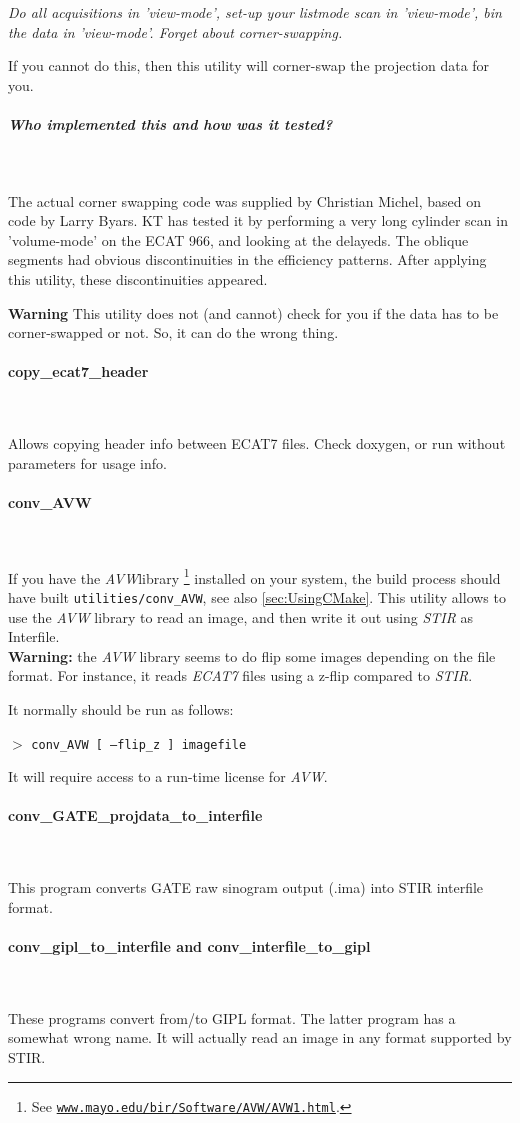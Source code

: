 \documentclass{article}
\def\url#1#2{\mbox{\href{#1}{\tt #2}}}
\newcommand{\subsubsubsection}[1]{\paragraph{#1}\mbox{} \\}
\newcommand{\subsubsubsubsection}[1]{\subparagraph{#1} \mbox{} \\}
\newcommand{\cmdline}[1]{\par \noindent $>$ \texttt{#1}\par}
\begin{document}
{{{\textit{Do all acquisitions in 'view-mode', set-up your listmode 
scan in 'view-mode', bin the data in 'view-mode'. Forget about 
corner-swapping.}


If you cannot do this, then this utility will corner-swap the 
projection data for you.

{ \subsubsubsubsection{Who implemented this and how was it tested?}
}
The actual corner swapping code was supplied by Christian Michel, 
based on code by Larry Byars. KT has tested it by performing 
a very long cylinder scan in 'volume-mode' on the ECAT 966, and 
looking at the delayeds. The oblique segments had obvious discontinuities 
in the efficiency patterns. After applying this utility, these 
discontinuities appeared.



\textbf{Warning} This utility does not (and cannot) check for you 
if the data has to be corner-swapped or not. So, it can do the 
wrong thing.

{ \subsubsubsection{copy\_ecat7\_header}
}
Allows copying header info between ECAT7 files. Check doxygen, or run without 
parameters for usage info.

{ \subsubsubsection{conv\_AVW}
}
\label{sec:convAVW}
If you have the \textit{AVW}\texttrademark  library
\footnote{See \url{http://www.mayo.edu/bir/Software/AVW/AVW1.html}
{www.mayo.edu/bir/Software/AVW/AVW1.html}.
} installed on your system, the build process should have built \texttt{utilities/conv\_AVW},
see also \ref{sec:UsingCMake}.
This utility allows to use the \textit{AVW} library to read an image, and then write it out
using \textit{STIR} as Interfile.\\
\textbf{Warning:} the \textit{AVW} library seems to do flip some images depending
on the file format. For instance, it reads \textit{ECAT7} files using a z-flip compared
to \textit{STIR}.

It normally should be run as follows:
\cmdline{conv\_AVW [ --flip\_z ] imagefile}

It will require access to a run-time license for \textit{AVW}.

{ \subsubsubsection{conv\_GATE\_projdata\_to\_interfile}
}
This program converts GATE raw sinogram output (.ima) into STIR interfile format. 

{ \subsubsubsection{conv\_gipl\_to\_interfile and conv\_interfile\_to\_gipl}
}
These programs convert from/to GIPL format. The latter program has a somewhat wrong name.
It will actually read an image in any format supported by STIR.


}}}
\end{document}
